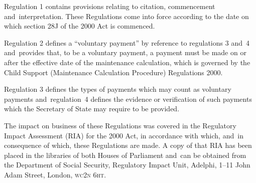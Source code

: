 \documentclass[12pt,a4paper]{article}
\begin{document}
Regulation 1 contains provisions relating to citation, commencement and~interpretation. These Regulations come into force according to the date on which section 28J of the 2000 Act is commenced.

Regulation 2 defines a “voluntary payment” by reference to regulations 3 and~4 and~provides that, to be a voluntary payment, a payment must be made on or after the effective date of the maintenance calculation, which is governed by the Child Support (Maintenance Calculation Procedure) Regulations 2000.

Regulation 3 defines the types of payments which may count as voluntary payments and~regulation~4 defines the evidence or verification of such payments which the Secretary of State may require to be provided.

The impact on business of these Regulations was covered in the Regulatory Impact Assessment (RIA) for the 2000 Act, in accordance with which, and~in consequence of which, these Regulations are made. A copy of that RIA has been placed in the libraries of both Houses of Parliament and~can be obtained from the Department of Social Security, Regulatory Impact Unit, Adelphi, 1--11 John Adam Street, London, \textsc{\lowercase{WC2N 6HT}}. 
\end{document}
